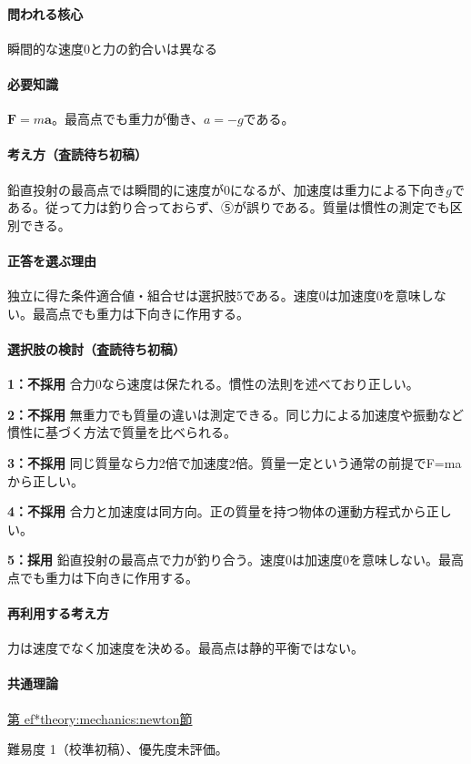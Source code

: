 \paragraph{問われる核心} 瞬間的な速度0と力の釣合いは異なる

\paragraph{必要知識} \(\mathbf F=m\mathbf a\)。最高点でも重力が働き、\(a=-g\)である。

\paragraph{考え方（査読待ち初稿）} 鉛直投射の最高点では瞬間的に速度が0になるが、加速度は重力による下向き\(g\)である。従って力は釣り合っておらず、⑤が誤りである。質量は慣性の測定でも区別できる。

\paragraph{正答を選ぶ理由} 独立に得た条件適合値・組合せは選択肢5である。速度0は加速度0を意味しない。最高点でも重力は下向きに作用する。

\paragraph{選択肢の検討（査読待ち初稿）}

\noindent\textbf{1：不採用} 合力0なら速度は保たれる。慣性の法則を述べており正しい。\par

\noindent\textbf{2：不採用} 無重力でも質量の違いは測定できる。同じ力による加速度や振動など慣性に基づく方法で質量を比べられる。\par

\noindent\textbf{3：不採用} 同じ質量なら力2倍で加速度2倍。質量一定という通常の前提でF=maから正しい。\par

\noindent\textbf{4：不採用} 合力と加速度は同方向。正の質量を持つ物体の運動方程式から正しい。\par

\noindent\textbf{5：採用} 鉛直投射の最高点で力が釣り合う。速度0は加速度0を意味しない。最高点でも重力は下向きに作用する。\par

\paragraph{再利用する考え方} 力は速度でなく加速度を決める。最高点は静的平衡ではない。

\paragraph{共通理論} \hyperref[theory:mechanics:newton]{第
ef*{theory:mechanics:newton}節}

\par 難易度 1（校準初稿）、優先度未評価。
